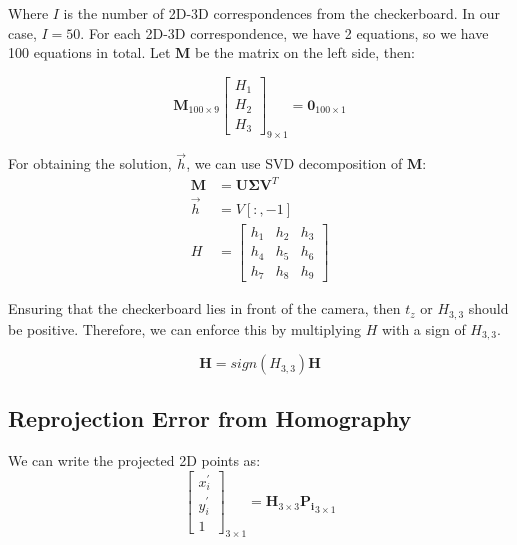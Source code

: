 \documentclass{article}
\begin{document}
Where $\mathit{I}$ is the number of 2D-3D correspondences from the checkerboard. In our case, $\mathit{I} = 50$. For each 2D-3D correspondence, we have 2 equations, so we have 100 equations in total. 
Let $\mathbf{M}$ be the matrix on the left side, then:

\begin{equation}
    \mathbf{M}_{100 \times 9} \begin{bmatrix} H_1 \\ H_2 \\ H_3 \end{bmatrix}_{9 \times 1} = \mathbf{0}_{100 \times 1}
\end{equation}

For obtaining the solution, $\vec{h}$, we can use SVD decomposition of $\mathbf{M}$:
\begin{align}
    \mathbf{M} &= \mathbf{U} \mathbf{\Sigma} \mathbf{V}^T \\
    \vec{h} &= V[:, -1] \\
    H &= \begin{bmatrix} h_1 & h_2 & h_3 \\ h_4 & h_5 & h_6 \\ h_7 & h_8 & h_9 \end{bmatrix}
\end{align}

Ensuring that the checkerboard lies in front of the camera, then $t_z$ or $H_{3,3}$ should be positive. Therefore, we can enforce this by multiplying $H$ with a sign of $H_{3,3}$.

\begin{equation}
    \mathbf{H} = sign(H_{3,3}) \mathbf{H}
\end{equation}

\subsection{Reprojection Error from Homography}
We can write the projected 2D points as:
\begin{equation}
    \begin{bmatrix}
    x_i^{'} \\ y_i^{'} \\ 1
    \end{bmatrix}_{3 \times 1} = \mathbf{H}_{3 \times 3} \mathbf{P_i}_{3 \times 1}
\end{equation}
\end{document}
